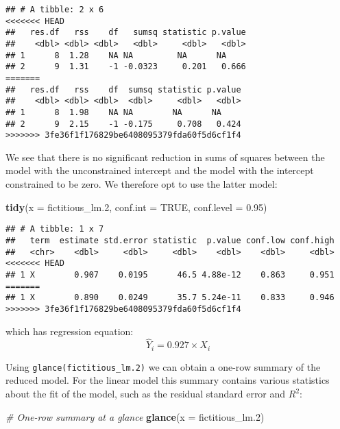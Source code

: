 \documentclass[
]{book}
\newenvironment{Shaded}{\begin{snugshade}}{\end{snugshade}}
\newcommand{\CommentTok}[1]{\textcolor[rgb]{0.56,0.35,0.01}{\textit{#1}}}
\newcommand{\DataTypeTok}[1]{\textcolor[rgb]{0.13,0.29,0.53}{#1}}
\newcommand{\FloatTok}[1]{\textcolor[rgb]{0.00,0.00,0.81}{#1}}
\newcommand{\KeywordTok}[1]{\textcolor[rgb]{0.13,0.29,0.53}{\textbf{#1}}}
\newcommand{\NormalTok}[1]{#1}
\newcommand{\OtherTok}[1]{\textcolor[rgb]{0.56,0.35,0.01}{#1}}
\begin{document}
\begin{verbatim}
## # A tibble: 2 x 6
<<<<<<< HEAD
##   res.df   rss    df   sumsq statistic p.value
##    <dbl> <dbl> <dbl>   <dbl>     <dbl>   <dbl>
## 1      8  1.28    NA NA         NA      NA    
## 2      9  1.31    -1 -0.0323     0.201   0.666
=======
##   res.df   rss    df  sumsq statistic p.value
##    <dbl> <dbl> <dbl>  <dbl>     <dbl>   <dbl>
## 1      8  1.98    NA NA        NA      NA    
## 2      9  2.15    -1 -0.175     0.708   0.424
>>>>>>> 3fe36f1f176829be6408095379fda60f5d6cf1f4
\end{verbatim}

We see that there is no significant reduction in sums of squares between the model with the unconstrained intercept and the model with the intercept constrained to be zero. We therefore opt to use the latter model:

\begin{Shaded}
\begin{Highlighting}[]
\KeywordTok{tidy}\NormalTok{(}\DataTypeTok{x =}\NormalTok{ fictitious_lm}\FloatTok{.2}\NormalTok{,}
     \DataTypeTok{conf.int =} \OtherTok{TRUE}\NormalTok{,}
     \DataTypeTok{conf.level =} \FloatTok{0.95}\NormalTok{)}
\end{Highlighting}
\end{Shaded}

\begin{verbatim}
## # A tibble: 1 x 7
##   term  estimate std.error statistic  p.value conf.low conf.high
##   <chr>    <dbl>     <dbl>     <dbl>    <dbl>    <dbl>     <dbl>
<<<<<<< HEAD
## 1 X        0.907    0.0195      46.5 4.88e-12    0.863     0.951
=======
## 1 X        0.890    0.0249      35.7 5.24e-11    0.833     0.946
>>>>>>> 3fe36f1f176829be6408095379fda60f5d6cf1f4
\end{verbatim}

which has regression equation:
\[
\hat Y_i=0.927\times X_i
\]

Using \texttt{glance(fictitious\_lm.2)} we can obtain a one-row summary of the reduced model. For the linear model this summary contains various statistics about the fit of the model, such as the residual standard error and \(R^2\):

\begin{Shaded}
\begin{Highlighting}[]
\CommentTok{# One-row summary at a glance}
\KeywordTok{glance}\NormalTok{(}\DataTypeTok{x =}\NormalTok{ fictitious_lm}\FloatTok{.2}\NormalTok{)}
\end{Highlighting}
\end{Shaded}
\end{document}
